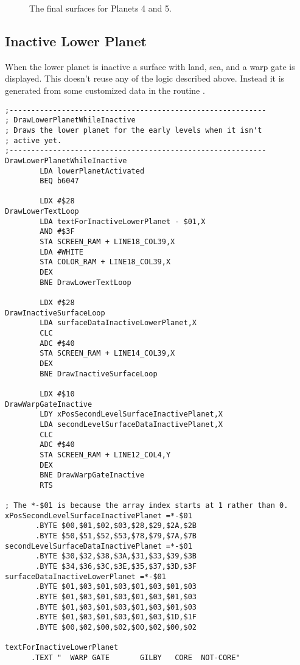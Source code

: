 \begin{figure}[H]
  {
    \begin{adjustbox}{width=10cm,center}
      \begin{subfigure}{0.7\textwidth}
      \end{subfigure}
      \begin{subfigure}{0.7\textwidth}
      \end{subfigure}
  \end{adjustbox}
  }\caption[]{The final surfaces for Planets 4 and 5.}
\end{figure}

\subsection{Inactive Lower Planet}
When the lower planet is inactive a surface with land, sea, and a warp gate is displayed. This doesn't reuse
any of the logic described above. Instead it is generated from some customized data in the routine
.

\begin{lstlisting}[caption=Draw the inactive lower planet.,basicstyle=\tiny]
;-----------------------------------------------------------
; DrawLowerPlanetWhileInactive
; Draws the lower planet for the early levels when it isn't
; active yet.
;-----------------------------------------------------------
DrawLowerPlanetWhileInactive
        LDA lowerPlanetActivated
        BEQ b6047

        LDX #$28
DrawLowerTextLoop   
        LDA textForInactiveLowerPlanet - $01,X
        AND #$3F
        STA SCREEN_RAM + LINE18_COL39,X
        LDA #WHITE
        STA COLOR_RAM + LINE18_COL39,X
        DEX
        BNE DrawLowerTextLoop

        LDX #$28
DrawInactiveSurfaceLoop   
        LDA surfaceDataInactiveLowerPlanet,X
        CLC
        ADC #$40
        STA SCREEN_RAM + LINE14_COL39,X
        DEX
        BNE DrawInactiveSurfaceLoop

        LDX #$10
DrawWarpGateInactive   
        LDY xPosSecondLevelSurfaceInactivePlanet,X
        LDA secondLevelSurfaceDataInactivePlanet,X
        CLC
        ADC #$40
        STA SCREEN_RAM + LINE12_COL4,Y
        DEX
        BNE DrawWarpGateInactive
        RTS

; The *-$01 is because the array index starts at 1 rather than 0.
xPosSecondLevelSurfaceInactivePlanet =*-$01
       .BYTE $00,$01,$02,$03,$28,$29,$2A,$2B
       .BYTE $50,$51,$52,$53,$78,$79,$7A,$7B
secondLevelSurfaceDataInactivePlanet =*-$01 
       .BYTE $30,$32,$38,$3A,$31,$33,$39,$3B
       .BYTE $34,$36,$3C,$3E,$35,$37,$3D,$3F
surfaceDataInactiveLowerPlanet =*-$01       
       .BYTE $01,$03,$01,$03,$01,$03,$01,$03
       .BYTE $01,$03,$01,$03,$01,$03,$01,$03
       .BYTE $01,$03,$01,$03,$01,$03,$01,$03
       .BYTE $01,$03,$01,$03,$01,$03,$1D,$1F
       .BYTE $00,$02,$00,$02,$00,$02,$00,$02

textForInactiveLowerPlanet
      .TEXT "  WARP GATE       GILBY   CORE  NOT-CORE"
\end{lstlisting}


